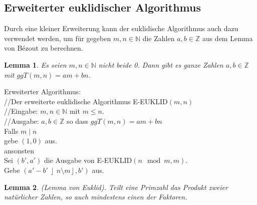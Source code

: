 \documentclass{scrartcl}
\newtheorem{lem}{Lemma}
\begin{document}
\subsection{Erweiterter euklidischer Algorithmus}
Durch eine kleiner Erweiterung kann der euklidische Algorithmus auch dazu verwendet werden, um für gegeben $m,n \in \mathbb{N}$ die Zahlen $a,b \in \mathbb{Z}$ aus dem Lemma von Bézout zu berechnen. 
\begin{lem}
Es seien $m,n \in \mathbb{N}$ nicht beide 0. Dann gibt es ganze Zahlen $a,b \in \mathbb{Z}$ mit $ggT(m,n)=am+bn$.
\end{lem}
Erweiterter Algorithmus:\\
//Der erweiterte euklidische Algorithmus E-EUKLID$(m,n)$\\
//Eingabe: $m,n \in \mathbb{N}$ mit $m\leq n$.\\
//Ausgabe: $a,b \in \mathbb{Z}$ so dass $ggT(m,n)=am+bn$\\
Falls $m\mid n$\\
\hspace{4pt}gebe $(1,0)$ aus.\\
ansonsten\\
\hspace{4pt}Sei $(b',a')$ die Ausgabe von E-EUKLID$(n\mod{m},m)$.\\
\hspace{4pt}Gebe $(a'-b'\left\rfloor{n\setminus m}\right\rfloor, b')$ aus.\\

\begin{lem}(Lemma von Euklid). Teilt eine Primzahl das Produkt zweier natürlicher Zahlen, so auch mindestens einen der Faktoren.
\end{lem}
\end{document}
